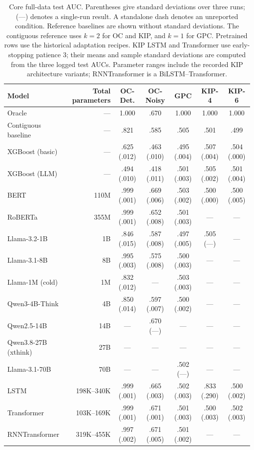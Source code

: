 \begin{table}[htbp]
\centering\small
\caption{Core full-data test AUC. Parentheses give standard deviations
over three runs; (---) denotes a single-run result. A standalone dash
denotes an unreported condition. Reference baselines are shown without
standard deviations. The contiguous reference uses $k=2$ for OC and KIP,
and $k=1$ for GPC. Pretrained rows use the historical adaptation recipes.
KIP LSTM and Transformer use early-stopping patience 3; their means and
sample standard deviations are computed from the three logged test AUCs.
Parameter ranges include the recorded KIP architecture variants;
RNNTransformer is a BiLSTM--Transformer.}
\label{tab:results_full}\label{tab:models}
\begin{tabular}{@{}lrccccc@{}}
\toprule
Model & Total parameters & OC-Det. & OC-Noisy & GPC & KIP-4 & KIP-6\\
\midrule
Oracle & --- & 1.000 & .670 & 1.000 & 1.000 & 1.000\\
Contiguous baseline & --- & .821 & .585 & .505 & .501 & .499\\
XGBoost (basic) & --- & .625 (.012) & .463 (.010) & .495 (.004) & .507 (.004) & .504 (.000)\\
XGBoost (LLM) & --- & .494 (.010) & .418 (.011) & .501 (.003) & .505 (.002) & .501 (.004)\\
BERT & 110M & .999 (.001) & .669 (.006) & .503 (.002) & .500 (.000) & .500 (.005)\\
RoBERTa & 355M & .999 (.001) & .652 (.008) & .501 (.003) & --- & ---\\
Llama-3.2-1B & 1B & .846 (.015) & .587 (.008) & .497 (.005) & .505 (---) & ---\\
Llama-3.1-8B & 8B & .995 (.003) & .575 (.008) & .500 (.003) & --- & ---\\
Llama-1M (cold) & 1M & .832 (.012) & --- & .503 (.003) & --- & ---\\
Qwen3-4B-Think & 4B & .850 (.014) & .597 (.007) & .500 (.002) & --- & ---\\
Qwen2.5-14B & 14B & --- & .670 (---) & --- & --- & ---\\
Qwen3.8-27B (xthink) & 27B & --- & --- & --- & --- & ---\\
Llama-3.1-70B & 70B & --- & --- & .502 (---) & --- & ---\\
LSTM & 198K--340K & .999 (.001) & .665 (.003) & .502 (.003) & .833 (.290) & .500 (.002)\\
Transformer & 103K--169K & .999 (.001) & .671 (.001) & .501 (.003) & .500 (.003) & .502 (.003)\\
RNNTransformer & 319K--455K & .997 (.002) & .671 (.005) & .501 (.002) & --- & ---\\
\bottomrule
\end{tabular}
\end{table}
